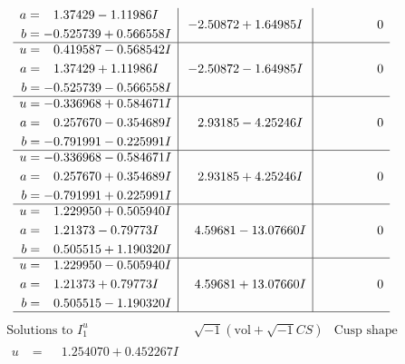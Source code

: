 \documentclass[1p]{elsarticle_modified}
\theoremstyle{definition}
\newcommand{\I}{\sqrt{-1}}
\begin{document}
$$\begin{array}{c|c|c}
\begin{aligned}
a &= \phantom{-}1.37429 - 1.11986 I \\
b &= -0.525739 + 0.566558 I\end{aligned}
 & -2.50872 + 1.64985 I & \phantom{-0.000000 } 0 \\ \hline\begin{aligned}
u &= \phantom{-}0.419587 - 0.568542 I \\
a &= \phantom{-}1.37429 + 1.11986 I \\
b &= -0.525739 - 0.566558 I\end{aligned}
 & -2.50872 - 1.64985 I & \phantom{-0.000000 } 0 \\ \hline\begin{aligned}
u &= -0.336968 + 0.584671 I \\
a &= \phantom{-}0.257670 - 0.354689 I \\
b &= -0.791991 - 0.225991 I\end{aligned}
 & \phantom{-}2.93185 - 4.25246 I & \phantom{-0.000000 } 0 \\ \hline\begin{aligned}
u &= -0.336968 - 0.584671 I \\
a &= \phantom{-}0.257670 + 0.354689 I \\
b &= -0.791991 + 0.225991 I\end{aligned}
 & \phantom{-}2.93185 + 4.25246 I & \phantom{-0.000000 } 0 \\ \hline\begin{aligned}
u &= \phantom{-}1.229950 + 0.505940 I \\
a &= \phantom{-}1.21373 - 0.79773 I \\
b &= \phantom{-}0.505515 + 1.190320 I\end{aligned}
 & \phantom{-}4.59681 - 13.07660 I & \phantom{-0.000000 } 0 \\ \hline\begin{aligned}
u &= \phantom{-}1.229950 - 0.505940 I \\
a &= \phantom{-}1.21373 + 0.79773 I \\
b &= \phantom{-}0.505515 - 1.190320 I\end{aligned}
 & \phantom{-}4.59681 + 13.07660 I & \phantom{-0.000000 } 0\\
 \hline 
 \end{array}$$\newpage$$\begin{array}{c|c|c}  
\text{Solutions to }I^u_{1}& \I (\text{vol} + \sqrt{-1}CS) & \text{Cusp shape}\\
 \hline 
\begin{aligned}
u &= \phantom{-}1.254070 + 0.452267 I \\

\end{aligned}
\end{array}$$
\end{document}
